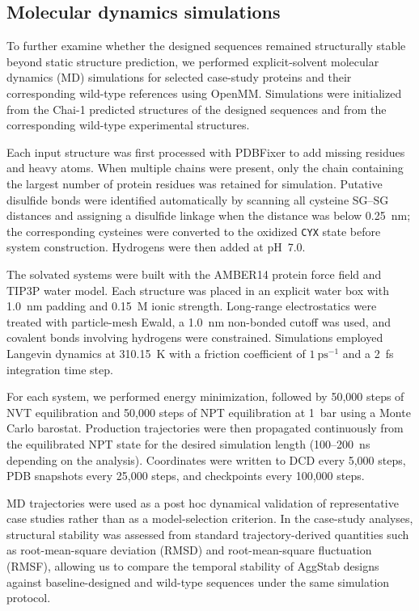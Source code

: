 \documentclass[pdflatex,sn-mathphys-num]{sn-jnl}%
\theoremstyle{thmstyleone}%
\theoremstyle{thmstyletwo}%
\theoremstyle{thmstylethree}%
\begin{document}
\subsection{Molecular dynamics simulations}\label{sec:md}

To further examine whether the designed sequences remained structurally stable beyond static structure prediction, we performed explicit-solvent molecular dynamics (MD) simulations for selected case-study proteins and their corresponding wild-type references using OpenMM. Simulations were initialized from the Chai-1 predicted structures of the designed sequences and from the corresponding wild-type experimental structures.

Each input structure was first processed with PDBFixer to add missing residues and heavy atoms. When multiple chains were present, only the chain containing the largest number of protein residues was retained for simulation. Putative disulfide bonds were identified automatically by scanning all cysteine SG--SG distances and assigning a disulfide linkage when the distance was below 0.25~nm; the corresponding cysteines were converted to the oxidized \texttt{CYX} state before system construction. Hydrogens were then added at pH~7.0.

The solvated systems were built with the AMBER14 protein force field and TIP3P water model. Each structure was placed in an explicit water box with 1.0~nm padding and 0.15~M ionic strength. Long-range electrostatics were treated with particle-mesh Ewald, a 1.0~nm non-bonded cutoff was used, and covalent bonds involving hydrogens were constrained. Simulations employed Langevin dynamics at 310.15~K with a friction coefficient of $1~\mathrm{ps}^{-1}$ and a 2~fs integration time step.

For each system, we performed energy minimization, followed by 50,000 steps of NVT equilibration and 50,000 steps of NPT equilibration at 1~bar using a Monte Carlo barostat. Production trajectories were then propagated continuously from the equilibrated NPT state for the desired simulation length (100--200~ns depending on the analysis). Coordinates were written to DCD every 5,000 steps, PDB snapshots every 25,000 steps, and checkpoints every 100,000 steps.

MD trajectories were used as a post hoc dynamical validation of representative case studies rather than as a model-selection criterion. In the case-study analyses, structural stability was assessed from standard trajectory-derived quantities such as root-mean-square deviation (RMSD) and root-mean-square fluctuation (RMSF), allowing us to compare the temporal stability of AggStab designs against baseline-designed and wild-type sequences under the same simulation protocol.
\end{document}
